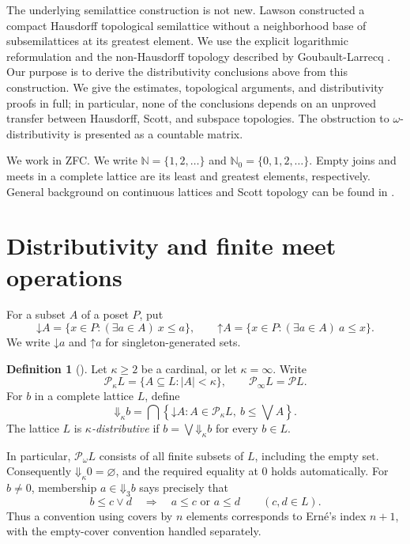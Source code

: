 \documentclass[11pt]{amsart}
\theoremstyle{definition}
\newtheorem{definition}[theorem]{Definition}
\theoremstyle{remark}
\numberwithin{equation}{section}
\newcommand{\NN}{\mathbb N}
\newcommand{\PP}{\mathcal P}
\newcommand{\dn}{\mathord\downarrow}
\newcommand{\up}{\mathord\uparrow}
\newcommand{\DD}{\mathord\Downarrow}
\begin{document}
The underlying semilattice construction is not new. Lawson
\cite[Section~2, Example~1]{Lawson1970} constructed a compact Hausdorff
topological semilattice without a neighborhood base of subsemilattices
at its greatest element. We use the explicit logarithmic reformulation
and the non-Hausdorff topology described by Goubault-Larrecq
\cite{GL2022}. Our purpose is to derive the distributivity conclusions
above from this construction. We give the estimates, topological
arguments, and distributivity proofs in full; in particular, none of
the conclusions depends on an unproved transfer between Hausdorff,
Scott, and subspace topologies. The obstruction to
$\omega$-distributivity is presented as a countable matrix.

We work in ZFC. We write $\NN=\{1,2,\ldots\}$ and
$\NN_0=\{0,1,2,\ldots\}$. Empty joins and meets in a complete lattice
are its least and greatest elements, respectively. General background
on continuous lattices and Scott topology can be found in
\cite{GierzEtAl2003}.

\section{Distributivity and finite meet operations}\label{sec:prelim}

For a subset $A$ of a poset $P$, put
\[
\dn A=\{x\in P:(\exists a\in A)\ x\leq a\},\qquad
\up A=\{x\in P:(\exists a\in A)\ a\leq x\}.
\]
We write $\dn a$ and $\up a$ for singleton-generated sets.

\begin{definition}[{\cite[Section~6]{Erne2009}}]\label{def:kappa}
Let $\kappa\geq 2$ be a cardinal, or let $\kappa=\infty$.
Write
\[
\PP_\kappa L=\{A\subseteq L:|A|<\kappa\},\qquad
\PP_\infty L=\PP L.
\]
For $b$ in a complete lattice $L$, define
\begin{equation}\label{eq:approx}
\DD_\kappa b
 =\bigcap\left\{\dn A:A\in\PP_\kappa L,
                          \ b\leq\bigvee A\right\}.
\end{equation}
The lattice $L$ is \emph{$\kappa$-distributive} if
$b=\bigvee\DD_\kappa b$ for every $b\in L$.
\end{definition}

In particular, $\PP_\omega L$ consists of all finite subsets of $L$,
including the empty set. Consequently $\DD_\kappa 0=\varnothing$,
and the required equality at $0$ holds automatically. For $b\ne 0$,
membership $a\in\DD_3 b$ says precisely that
\[
b\leq c\vee d\quad\Longrightarrow\quad a\leq c\text{ or }a\leq d
\qquad(c,d\in L).
\]
Thus a convention using covers by $n$ elements corresponds to
Ern\'e's index $n+1$, with the empty-cover convention handled separately.
\end{document}
